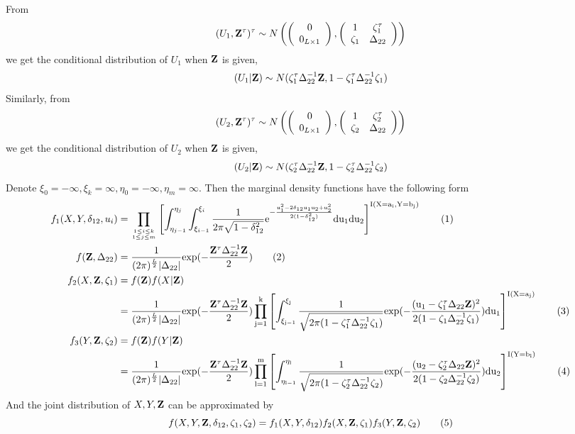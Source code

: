 \documentclass[a4,11pt,epsf, amssymb]{article}
\begin{document}
\begin{CJK}{GBK}{song}
From
$$(U_1,{\bf Z}^\tau)^\tau \sim N \left(\left(\begin{array}{c} 0 \\ 0_{L\times1}\end{array}\right),\left(\begin{array}{cc}1 & \zeta_1^\tau \\ \zeta_1 & \Delta_{22} \end{array}\right)\right)$$
we get the conditional distribution of $U_1$ when $\bf Z$ is given,
$$(U_1|{\bf Z}) \sim N(\zeta_1^\tau\Delta_{22}^{-1}{\bf Z}, 1-\zeta_1^\tau\Delta_{22}^{-1}\zeta_1)$$
Similarly, from
$$(U_2,{\bf Z}^\tau)^\tau \sim N \left(\left(\begin{array}{c} 0 \\ 0_{L\times1}\end{array}\right),\left(\begin{array}{cc}1 & \zeta_2^\tau \\ \zeta_2 & \Delta_{22} \end{array}\right)\right)$$
we get the conditional distribution of $U_2$ when $\bf Z$ is given,
$$(U_2|{\bf Z}) \sim N(\zeta_2^\tau\Delta_{22}^{-1}{\bf Z}, 1-\zeta_2^\tau\Delta_{22}^{-1}\zeta_2)$$
Denote $\xi_0=-\infty, \xi_k=\infty,\eta_0=-\infty, \eta_m=\infty$. Then the marginal density functions have the following form
\begin{align*}
f_1(X,Y,\delta_{12},u_i) & = \prod_{1\leq i \leq k \atop 1\leq j \leq m}\left[\int_{\eta_{j-1}}^{\eta_j} \int_{\xi_{i-1}}^{\xi_i}\frac 1{2\pi \sqrt{1-\delta_{12}^2}}\rm e^{-\frac {u_1^2 - 2\delta_{12}u_1u_2 + u_2^2}{2(1-\delta_{12}^2)}}\rm du_1 \rm du_2 \right]^{\rm I(X = a_i, Y=b_j)}  \tag{$1$} \\
f({\bf Z},\Delta_{22}) & = \frac 1{(2\pi)^{\frac L2}|\Delta_{22}|}\rm exp{(-\frac {{\bf Z}^\tau \Delta_{22}^{-1}{\bf Z}}{2})}  \tag{$2$}\\
f_2(X,{\bf Z}, \zeta_1) & = f({\bf Z})f(X|{\bf Z}) \\
 & = \frac 1{(2\pi)^{\frac L2}|\Delta_{22}|}\rm exp{(-\frac {{\bf Z}^\tau \Delta_{22}^{-1}{\bf Z}}{2})}\prod_{j = 1}^k\left[\int_{\xi_{j-1}}^{\xi_j}\frac 1{\sqrt{2\pi(1-\zeta_1^\tau\Delta_{22}^{-1}\zeta_1)}}\rm exp{(-\frac {(u_1 - \zeta_1^\tau\Delta_{22}{\bf Z})^2}{2(1-\zeta_1\Delta_{22}^{-1}\zeta_1)})}\rm du_1\right]^{\rm I(X=a_j)}  \tag{$3$}\\
f_3(Y,{\bf Z}, \zeta_2) & = f({\bf Z})f(Y|{\bf Z}) \\
 & = \frac 1{(2\pi)^{\frac L2}|\Delta_{22}|}\rm exp{(-\frac {{\bf Z}^\tau \Delta_{22}^{-1}{\bf Z}}{2})}\prod_{l = 1}^m\left[\int_{\eta_{l-1}}^{\eta_l}\frac 1{\sqrt{2\pi(1-\zeta_2^\tau\Delta_{22}^{-1}\zeta_2)}}\rm exp{(-\frac {(u_2 - \zeta_2^\tau\Delta_{22}{\bf Z})^2}{2(1-\zeta_2\Delta_{22}^{-1}\zeta_2)})}\rm du_2\right]^{{\rm I}(Y=b_l)}  \tag{$4$}
\end{align*}
And the joint distribution of $X,Y,\bf {Z}$ can be approximated by
\begin{equation*}
f(X,Y,{\bf Z}, \delta_{12},\zeta_1,\zeta_2) = f_1(X,Y,\delta_{12})f_2(X,{\bf Z}, \zeta_1)f_3(Y,{\bf Z}, \zeta_2) \tag{$5$}
\end{equation*}


\end{CJK}
\end{document}
